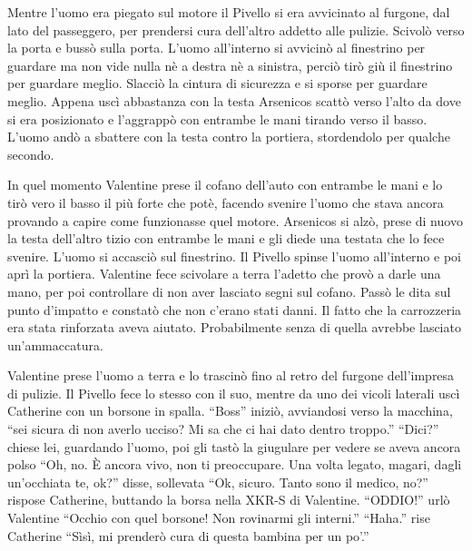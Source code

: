     Mentre l'uomo era piegato sul motore il Pivello si era avvicinato al furgone, dal lato del passeggero, per prendersi
    cura dell'altro addetto alle pulizie. Scivolò verso la porta e bussò sulla porta. L'uomo all'interno si avvicinò al
    finestrino per guardare ma non vide nulla nè a destra nè a sinistra, perciò tirò giù il finestrino per guardare
    meglio. Slacciò la cintura di sicurezza e si sporse per guardare meglio. Appena uscì abbastanza con la testa
    Arsenicos scattò verso l'alto da dove si era posizionato e l'aggrappò con entrambe le mani tirando verso il basso.
    L'uomo andò a sbattere con la testa contro la portiera, stordendolo per qualche secondo.

    In quel momento Valentine prese il cofano dell'auto con entrambe le mani e lo tirò vero il basso il più forte che
    potè, facendo svenire l'uomo che stava ancora provando a capire come funzionasse quel motore. Arsenicos si alzò,
    prese di nuovo la testa dell'altro tizio con entrambe le mani e gli diede una testata che lo fece svenire. L'uomo si
    accasciò sul finestrino. Il Pivello spinse l'uomo all'interno e poi aprì la portiera. Valentine fece scivolare a
    terra l'adetto che provò a darle una mano, per poi controllare di non aver lasciato segni sul cofano. Passò le dita
    sul punto d'impatto e constatò che non c'erano stati danni. Il fatto che la carrozzeria era stata rinforzata aveva
    aiutato. Probabilmente senza di quella avrebbe lasciato un'ammaccatura.

    Valentine prese l'uomo a terra e lo trascinò fino al retro del furgone dell'impresa di pulizie. Il Pivello fece lo
    stesso con il suo, mentre da uno dei vicoli laterali uscì Catherine con un borsone in spalla. ``Boss'' iniziò,
    avviandosi verso la macchina, ``sei sicura di non averlo ucciso? Mi sa che ci hai dato dentro troppo.'' ``Dici?''
    chiese lei, guardando l'uomo, poi gli tastò la giugulare per vedere se aveva ancora polso ``Oh, no. È ancora vivo,
    non ti preoccupare. Una volta legato, magari, dagli un'occhiata te, ok?'' disse, sollevata ``Ok, sicuro. Tanto sono
    il medico, no?'' rispose Catherine, buttando la borsa nella XKR-S di Valentine. ``ODDIO!'' urlò Valentine ``Occhio
    con quel borsone! Non rovinarmi gli interni.'' ``Haha.'' rise Catherine ``Sìsì, mi prenderò cura di questa bambina
    per un po'.''

